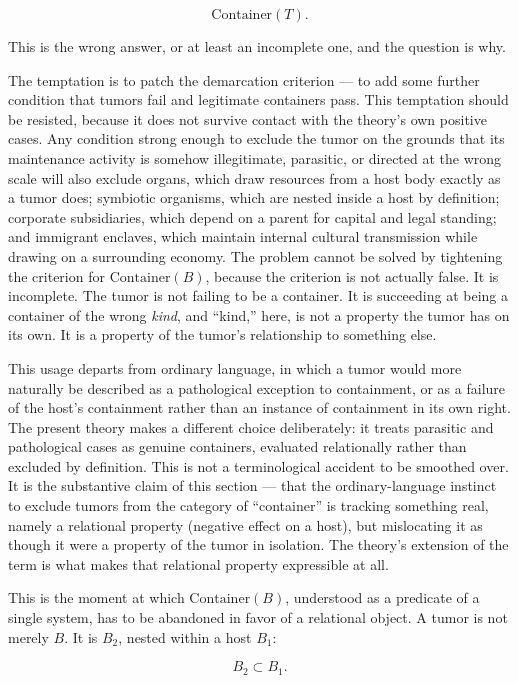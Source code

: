 \documentclass[11pt]{article}
\theoremstyle{plain}
\begin{document}
\[\mathrm{Container}(T).\]

This is the wrong answer, or at least an incomplete one, and the question is why.

The temptation is to patch the demarcation criterion --- to add some further condition that tumors fail and legitimate containers pass. This temptation should be resisted, because it does not survive contact with the theory's own positive cases. Any condition strong enough to exclude the tumor on the grounds that its maintenance activity is somehow illegitimate, parasitic, or directed at the wrong scale will also exclude organs, which draw resources from a host body exactly as a tumor does; symbiotic organisms, which are nested inside a host by definition; corporate subsidiaries, which depend on a parent for capital and legal standing; and immigrant enclaves, which maintain internal cultural transmission while drawing on a surrounding economy. The problem cannot be solved by tightening the criterion for \(\mathrm{Container}(B)\), because the criterion is not actually false. It is incomplete. The tumor is not failing to be a container. It is succeeding at being a container of the wrong \emph{kind}, and ``kind,'' here, is not a property the tumor has on its own. It is a property of the tumor's relationship to something else.

This usage departs from ordinary language, in which a tumor would more naturally be described as a pathological exception to containment, or as a failure of the host's containment rather than an instance of containment in its own right. The present theory makes a different choice deliberately: it treats parasitic and pathological cases as genuine containers, evaluated relationally rather than excluded by definition. This is not a terminological accident to be smoothed over. It is the substantive claim of this section --- that the ordinary-language instinct to exclude tumors from the category of ``container'' is tracking something real, namely a relational property (negative effect on a host), but mislocating it as though it were a property of the tumor in isolation. The theory's extension of the term is what makes that relational property expressible at all.

This is the moment at which \(\mathrm{Container}(B)\), understood as a predicate of a single system, has to be abandoned in favor of a relational object. A tumor is not merely \(B\). It is \(B_2\), nested within a host \(B_1\):

\[B_2 \subset B_1.\]
\end{document}
